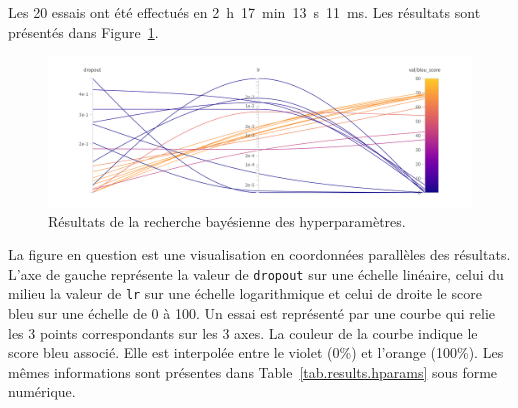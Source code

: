Les 20 essais ont été effectués en 2~h~17~min~13~s~11~ms.
Les résultats sont présentés dans Figure~\ref{fig.results.hparams}.
\begin{figure}[hbt]
    \centering
    \includegraphics[width=.8\textwidth]{assets/images/sweep.png}
    \caption{Résultats de la recherche bayésienne des hyperparamètres.}%
    \label{fig.results.hparams}
\end{figure}
La figure en question est une visualisation en coordonnées parallèles des résultats.
L'axe de gauche représente la valeur de \verb|dropout| sur une échelle linéaire, 
celui du milieu la valeur de \verb|lr| sur une échelle logarithmique 
et celui de droite le score \gls{bleu} sur une échelle de 0 à 100.
Un essai est représenté par une courbe qui relie les 3 points correspondants sur les 3 axes.
La couleur de la courbe indique le score \gls{bleu} associé.
Elle est interpolée entre le violet (0\%) et l'orange (100\%).
Les mêmes informations sont présentes dans Table~\ref{tab.results.hparams} sous forme numérique.

